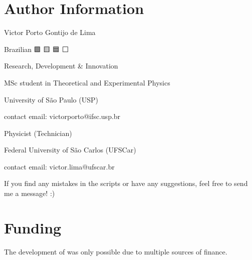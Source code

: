 \documentclass[letterpaper,10pt,english]{sphinxmanual}
\begin{document}
\chapter{Author Information}
\label{\detokenize{index:author-information}}
\begin{DUlineblock}{0em}
\item[] Victor Porto Gontijo de Lima
\item[] Brazilian 🟩 🟨 🟦 ⬜
\item[] Research, Development \& Innovation
\end{DUlineblock}

\begin{DUlineblock}{0em}
\item[] MSc student in Theoretical and Experimental Physics
\item[] University of São Paulo (USP)
\item[] contact e\sphinxhyphen{}mail: victorporto@ifsc.usp.br
\end{DUlineblock}

\begin{DUlineblock}{0em}
\item[] Physicist (Technician)
\item[] Federal University of São Carlos (UFSCar)
\item[] contact e\sphinxhyphen{}mail: victor.lima@ufscar.br
\end{DUlineblock}

\sphinxAtStartPar
If you find any mistakes in the scripts or have any suggestions, feel free to send me a message! :)


\chapter{Funding}
\label{\detokenize{index:funding}}
\sphinxAtStartPar
The development of  was only possible due to multiple sources of finance.
\end{document}
